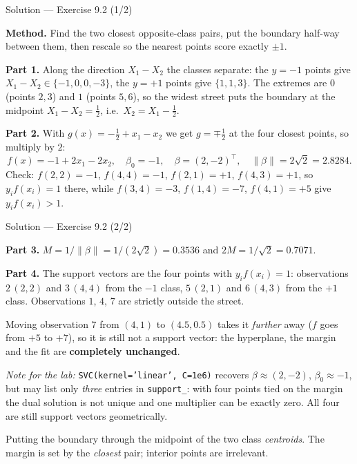 \documentclass[aspectratio=169,11pt]{beamer}
\begin{document}
\begin{frame}{Solution --- Exercise 9.2 (1/2)}
\begin{solutionbox}
  \textbf{Method.} Find the two closest opposite-class pairs, put the boundary
  half-way between them, then rescale so the nearest points score exactly
  $\pm1$.

  \textbf{Part 1.} Along the direction $X_1-X_2$ the classes separate: the
  $y=-1$ points give $X_1-X_2 \in \{-1,0,0,-3\}$, the $y=+1$ points give
  $\{1,1,3\}$. The extremes are $0$ (points $2,3$) and $1$ (points $5,6$), so
  the widest street puts the boundary at the midpoint $X_1-X_2=\tfrac12$,
  i.e.\ $X_2=X_1-\tfrac12$.

  \textbf{Part 2.} With $g(x)= -\tfrac12 + x_1 - x_2$ we get
  $g=\mp\tfrac12$ at the four closest points, so multiply by $2$:
  \[
    f(x) = -1 + 2x_1 - 2x_2,
    \quad \beta_0=-1,\quad \beta=(2,-2)^\top,\quad
    \|\beta\|=2\sqrt2 = 2.8284 .
  \]
  Check: $f(2,2)=-1$, $f(4,4)=-1$, $f(2,1)=+1$, $f(4,3)=+1$, so
  $y_if(x_i)=1$ there, while $f(3,4)=-3$, $f(1,4)=-7$, $f(4,1)=+5$ give
  $y_if(x_i)>1$.
\end{solutionbox}
\end{frame}

\begin{frame}{Solution --- Exercise 9.2 (2/2)}
\begin{solutionbox}
  \scriptsize
  \textbf{Part 3.}
  $M=1/\|\beta\|=1/(2\sqrt2)=0.3536$ and $2M = 1/\sqrt2 = 0.7071$.

  \textbf{Part 4.} The support vectors are the four points with
  $y_if(x_i)=1$: observations $2\,(2,2)$ and $3\,(4,4)$ from the $-1$ class,
  $5\,(2,1)$ and $6\,(4,3)$ from the $+1$ class. Observations $1$, $4$, $7$
  are strictly outside the street.

  Moving observation $7$ from $(4,1)$ to $(4.5,0.5)$ takes it \emph{further}
  away ($f$ goes from $+5$ to $+7$), so it is still not a support vector: the
  hyperplane, the margin and the fit are \textbf{completely unchanged}.

  \textit{Note for the lab:} \texttt{SVC(kernel='linear', C=1e6)} recovers
  $\beta\approx(2,-2)$, $\beta_0\approx-1$, but may list only \emph{three}
  entries in \texttt{support\_}: with four points tied on the margin the dual
  solution is not unique and one multiplier can be exactly zero. All four are
  still support vectors geometrically.
\end{solutionbox}
\begin{mistake}
  Putting the boundary through the midpoint of the two class \emph{centroids}.
  The margin is set by the \emph{closest} pair; interior points are irrelevant.
\end{mistake}
\end{frame}
\end{document}
